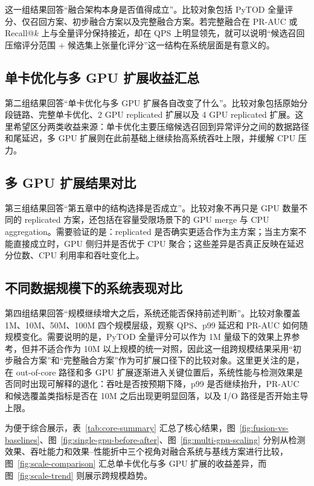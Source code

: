 这一组结果回答“融合架构本身是否值得成立”。比较对象包括 PyTOD 全量评分、仅召回方案、初步融合方案以及完整融合方案。若完整融合在 PR-AUC 或 Recall@$k$ 上与全量评分保持接近，却在 QPS 上明显领先，就可以说明“候选召回压缩评分范围 + 候选集上张量化评分”这一结构在系统层面是有意义的。

\subsection{单卡优化与多 GPU 扩展收益汇总}

第二组结果回答“单卡优化与多 GPU 扩展各自改变了什么”。比较对象包括原始分段链路、完整单卡优化、2 GPU replicated 扩展以及 4 GPU replicated 扩展。这里希望区分两类收益来源：单卡优化主要压缩候选召回到异常评分之间的数据路径和尾延迟，多 GPU 扩展则在此前基础上继续抬高系统吞吐上限，并缓解 CPU 压力。

\subsection{多 GPU 扩展结果对比}

第三组结果回答“第五章中的结构选择是否成立”。比较对象不再只是 GPU 数量不同的 replicated 方案，还包括在容量受限场景下的 GPU merge 与 CPU aggregation。需要验证的是：replicated 是否确实更适合作为主方案；当主方案不能直接成立时，GPU 侧归并是否优于 CPU 聚合；这些差异是否真正反映在延迟分位数、CPU 利用率和吞吐变化上。

\subsection{不同数据规模下的系统表现对比}

第四组结果回答“规模继续增大之后，系统还能否保持前述判断”。比较对象覆盖 1M、10M、50M、100M 四个规模层级，观察 QPS、p99 延迟和 PR-AUC 如何随规模变化。需要说明的是，PyTOD 全量评分可以作为 1M 量级下的效果上界参考，但并不适合作为 10M 以上规模的统一对照，因此这一组跨规模结果采用“初步融合方案”和“完整融合方案”作为可扩展口径下的比较对象。这里更关注的是，在 out-of-core 路径和多 GPU 扩展逐渐进入关键位置后，系统性能与检测效果是否同时出现可解释的退化：吞吐是否按预期下降，p99 是否继续抬升，PR-AUC 和候选覆盖类指标是否在 10M 之后出现更明显回落，以及 I/O 路径是否开始主导上限。

为便于综合展示，表~\ref{tab:core-summary} 汇总了核心结果，图~\ref{fig:fusion-vs-baselines}、图~\ref{fig:single-gpu-before-after}、图~\ref{fig:multi-gpu-scaling} 分别从检测效果、吞吐能力和效果--性能折中三个视角对融合系统与基线方案进行比较，图~\ref{fig:scale-comparison} 汇总单卡优化与多 GPU 扩展的收益差异，而图~\ref{fig:scale-trend} 则展示跨规模趋势。

